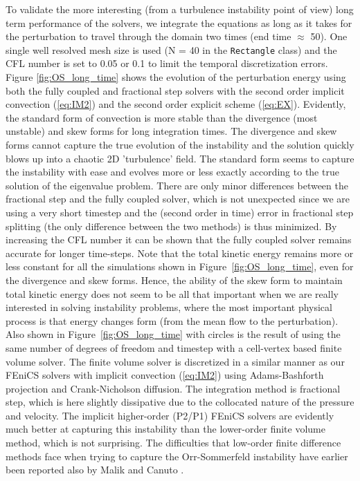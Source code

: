 To validate the more interesting (from a turbulence instability point of view) long term performance of the solvers, we integrate the equations as long as it takes for the perturbation to travel through the domain two times (end time $\approx$ 50). One single well resolved mesh size is used (N = 40 in the {\fontsize{12pt}{12pt}\texttt{Rectangle}} class) and the CFL number is set to 0.05 or 0.1 to limit the temporal discretization errors. Figure \ref{fig:OS_long_time} shows the evolution of the perturbation energy using both the fully coupled and fractional step solvers with the second order implicit convection (\ref{eq:IM2}) and the second order explicit scheme (\ref{eq:EX}). Evidently, the standard form of convection is more stable than the divergence (most unstable) and skew forms for long integration times. The divergence and skew forms cannot capture the true evolution of the instability and the solution quickly blows up into a chaotic 2D 'turbulence' field. The standard form seems to capture the instability with ease and evolves more or less exactly according to the true solution of the eigenvalue problem. There are only minor differences between the fractional step and the fully coupled solver, which is not unexpected since we are using a very short timestep and the (second order in time) error in fractional step splitting (the only difference between the two methods) is thus minimized. By increasing the CFL number it can be shown that the fully coupled solver remains accurate for longer time-steps. Note that the total kinetic energy remains more or less constant for all the simulations shown in Figure~\ref{fig:OS_long_time}, even for the divergence and skew forms. Hence, the ability of the skew form to maintain total kinetic energy does not seem to be all that important when we are really interested in solving instability problems, where the most important physical process is that energy changes form (from the mean flow to the perturbation). Also shown in Figure~\ref{fig:OS_long_time} with circles is the result of using the same number of degrees of freedom and timestep with a cell-vertex based finite volume solver. The finite volume solver is discretized in a similar manner as our FEniCS solvers with implicit convection (\ref{eq:IM2}) using Adams-Bashforth projection and Crank-Nicholson diffusion. The integration method is fractional step, which is here slightly dissipative due to the collocated nature of the pressure and velocity. The implicit higher-order (P2/P1) FEniCS solvers are evidently much better at capturing this instability than the lower-order finite volume method, which is not surprising. The difficulties that low-order finite difference methods face when trying to capture the Orr-Sommerfeld instability have earlier been reported also by Malik \cite{MalikZangHussaini1984} and Canuto \cite{canuto07}.
